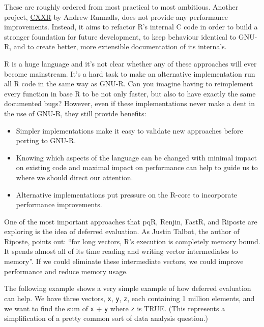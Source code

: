 These are roughly ordered from most practical to most ambitious. Another
project, \href{http://www.cs.kent.ac.uk/projects/cxxr/}{CXXR} by Andrew
Runnalls, does not provide any performance improvements. Instead, it
aims to refactor R's internal C code in order to build a stronger
foundation for future development, to keep behaviour identical to GNU-R,
and to create better, more extensible documentation of its internals.

R is a huge language and it's not clear whether any of these approaches
will ever become mainstream. It's a hard task to make an alternative
implementation run all R code in the same way as GNU-R. Can you imagine
having to reimplement every function in base R to be not only faster,
but also to have exactly the same documented bugs? However, even if
these implementations never make a dent in the use of GNU-R, they still
provide benefits:

\begin{itemize}
\item
  Simpler implementations make it easy to validate new approaches before
  porting to GNU-R.
\item
  Knowing which aspects of the language can be changed with minimal
  impact on existing code and maximal impact on performance can help to
  guide us to where we should direct our attention.
\item
  Alternative implementations put pressure on the R-core to incorporate
  performance improvements.
\end{itemize}

One of the most important approaches that pqR, Renjin, FastR, and
Riposte are exploring is the idea of deferred evaluation. As Justin
Talbot, the author of Riposte, points out: ``for long vectors, R's
execution is completely memory bound. It spends almost all of its time
reading and writing vector intermediates to memory''. If we could
eliminate these intermediate vectors, we could improve performance and
reduce memory usage. 

The following example shows a very simple example of how deferred
evaluation can help. We have three vectors, \texttt{x}, \texttt{y},
\texttt{z}, each containing 1 million elements, and we want to find the
sum of \texttt{x} + \texttt{y} where \texttt{z} is TRUE. (This
represents a simplification of a pretty common sort of data analysis
question.)

\begin{Shaded}
\begin{Highlighting}[]
\StringTok{ }\NormalTok{(}\NormalTok{)}
\StringTok{ }\NormalTok{(}\NormalTok{)}
\StringTok{ }\NormalTok{(}\NormalTok{, } \NormalTok{)}

\StringTok{ }
\end{Highlighting}
\end{Shaded}

